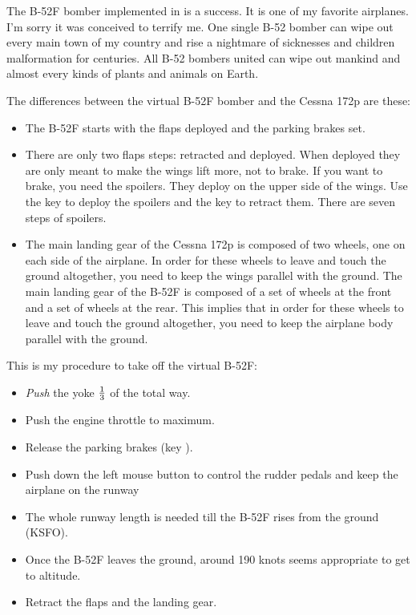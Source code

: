 \begin{itemize}
  The B-52F bomber implemented in \FlightGear is a success. It is one of my
  favorite airplanes. I'm sorry it was conceived to terrify me. One
  single B-52 bomber can wipe out every main town of my country and
  rise a nightmare of sicknesses and children malformation for
  centuries. All B-52 bombers united can wipe out mankind and almost
  every kinds of plants and animals on Earth.

  The differences between the virtual B-52F bomber and the Cessna 172p are these:
\begin{itemize}
    \item The B-52F starts with the flaps deployed and the parking brakes set.
    \item There are only two flaps steps: retracted and deployed. When deployed they are only meant to make the wings lift more, not to brake. If you want to brake, you need the spoilers. They deploy on the upper side of the wings. Use the key  to deploy the spoilers and the key  to retract them. There are seven steps of spoilers.
    \item The main landing gear of the Cessna 172p is composed of two wheels, one on each side of the airplane. In order for these wheels to leave and touch the ground altogether, you need to keep the wings parallel with the ground. The main landing gear of the B-52F is composed of a set of wheels at the front and a set of wheels at the rear. This implies that in order for these wheels to leave and touch the ground altogether, you need to keep the airplane body parallel with the ground.
\end{itemize}
This is my procedure to take off the virtual B-52F:
\begin{itemize}
    \item \emph{Push} the yoke  $1\over3$ of the total way.
    \item Push the engine throttle to maximum.
    \item Release the parking brakes (key ).
    \item Push down the left mouse button to control the rudder pedals and keep the airplane on the runway
    \item The whole runway length is needed till the B-52F rises from the ground (KSFO).
    \item Once the B-52F leaves the ground, around 190 knots seems appropriate to get to altitude.
    \item Retract the flaps and the landing gear.
\end{itemize}


\end{itemize}
